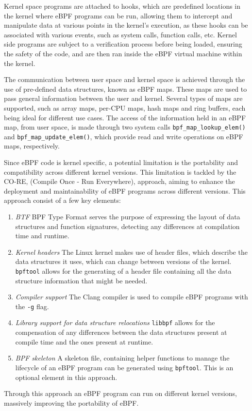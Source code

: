 Kernel space programs are attached to hooks, which are predefined locations in the kernel where eBPF programs can be run, allowing them to intercept and manipulate data at various points in the kernel's execution, as these hooks can be associated with various events, such as system calls, function calls, etc. Kernel side programs are subject to a verification process before being loaded, ensuring the safety of the code, and are then ran inside the eBPF virtual machine within the kernel. 

The communication between user space and kernel space is achieved through the use of pre-defined data structures, known as eBPF maps. These maps are used to pass general information between the user and kernel. Several types of maps are supported, such as array maps, per-CPU maps, hash maps and ring buffers, each being ideal for different use cases. The access of the information held in an eBPF map, from user space, is made through two system calls \texttt{bpf\_map\_lookup\_elem()} and \texttt{bpf\_map\_update\_elem()}, which provide read and write operations on eBPF maps, respectively.

Since eBPF code is kernel specific, a potential limitation is the portability and compatibility across different kernel versions. This limitation is tackled by the CO-RE, (Compile Once - Run Everywhere), approach, aiming to enhance the deployment and maintainability of eBPF programs across different versions. This approach consist of a few key elements:
\begin{enumerate}
    \item \textit{BTF} BPF Type Format serves the purpose of expressing the layout of data structures and function signatures, detecting any differences at compilation time and runtime. 
    \item \textit{Kernel headers} The Linux kernel makes use of header files, which describe the data structures it uses, which can change between versions of the kernel. \texttt{bpftool} allows for the generating of a header file containing all the data structure information that might be needed. 
    \item \textit{Compiler support} The Clang compiler is used to compile eBPF programs with the \texttt{-g} flag. 
    \item \textit{Library support for data structure relocations} \texttt{libbpf} allows for the compensation of any differences between the data structures present at compile time and the ones present at runtime.
    \item \textit{BPF skeleton} A skeleton file, containing helper functions to manage the lifecycle of an eBPF program can be generated using \texttt{bpftool}. This is an optional element in this approach. 
\end{enumerate}
Through this approach an eBPF program can run on different kernel versions, massively improving the portability of eBPF. 

